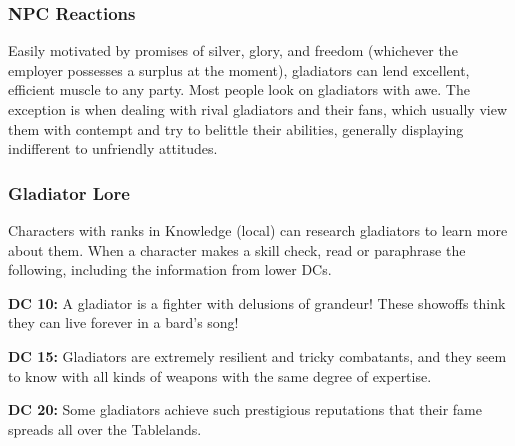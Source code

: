 \subsubsection{NPC Reactions}

Easily motivated by promises of silver, glory, and freedom (whichever the employer possesses a surplus at the moment), gladiators can lend excellent, efficient muscle to any party. Most people look on gladiators with awe. The exception is when dealing with rival gladiators and their fans, which usually view them with contempt and try to belittle their abilities, generally displaying indifferent to unfriendly attitudes.

\subsubsection{Gladiator Lore}

Characters with ranks in Knowledge (local) can research gladiators to learn more about them. When a character makes a skill check, read or paraphrase the following, including the information from lower DCs.

\textbf{DC 10:} A gladiator is a fighter with delusions of grandeur! These showoffs think they can live forever in a bard’s song!

\textbf{DC 15:} Gladiators are extremely resilient and tricky combatants, and they seem to know with all kinds of weapons with the same degree of expertise.

\textbf{DC 20:} Some gladiators achieve such prestigious reputations that their fame spreads all over the Tablelands.

